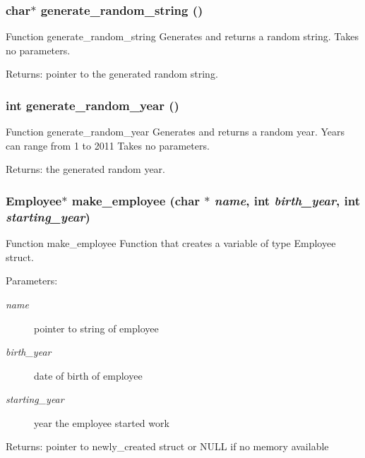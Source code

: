\subsubsection{\setlength{\rightskip}{0pt plus 5cm}char$\ast$ generate\_\-random\_\-string ()}\label{mystructs_8h_868d130585077b8c5c233a76cf38bead}


Function generate\_\-random\_\-string Generates and returns a random string. Takes no parameters. \begin{Desc}
\item[Returns:]pointer to the generated random string. \end{Desc}
\subsubsection{\setlength{\rightskip}{0pt plus 5cm}int generate\_\-random\_\-year ()}\label{mystructs_8h_0796fe72670169df5d9f571c8e3be793}


Function generate\_\-random\_\-year Generates and returns a random year. Years can range from 1 to 2011 Takes no parameters. \begin{Desc}
\item[Returns:]the generated random year. \end{Desc}
\subsubsection{\setlength{\rightskip}{0pt plus 5cm}\bf{Employee}$\ast$ make\_\-employee (char $\ast$ {\em name}, int {\em birth\_\-year}, int {\em starting\_\-year})}\label{mystructs_8h_a660f63ad574330839a430ff4e2ed1cf}


Function make\_\-employee Function that creates a variable of type Employee struct. \begin{Desc}
\item[Parameters:]
\begin{description}
\item[{\em name}]pointer to string of employee \item[{\em birth\_\-year}]date of birth of employee \item[{\em starting\_\-year}]year the employee started work \end{description}
\end{Desc}
\begin{Desc}
\item[Returns:]pointer to newly\_\-created struct or NULL if no memory available \end{Desc}
